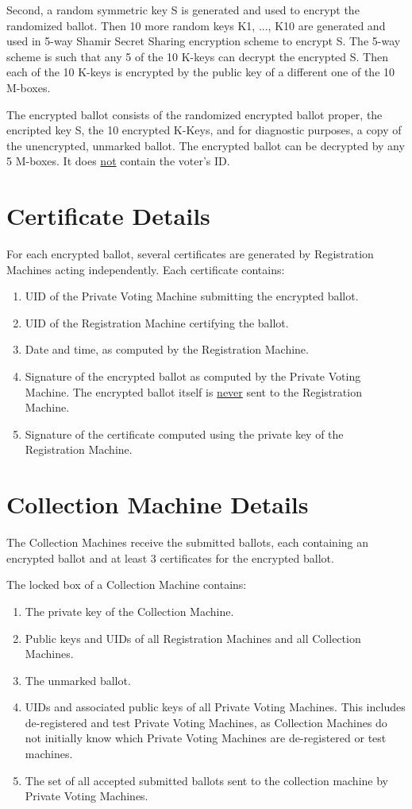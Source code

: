 \documentclass[12pt]{article}
\begin{document}
Second, a random symmetric key S is generated and used to encrypt
the randomized ballot.  Then 10 more random keys K1, ..., K10 are generated
and used in 5-way Shamir Secret Sharing encryption
scheme to encrypt S.  The 5-way
scheme is such that any 5 of the 10 K-keys can decrypt the encrypted S.
Then each of the 10 K-keys is encrypted by the public key
of a different one of the 10 M-boxes.

The encrypted ballot consists of the randomized encrypted ballot proper,
the encripted key S, the 10 encrypted K-Keys, and for
diagnostic purposes, a copy of the unencrypted, unmarked ballot.  The
encrypted ballot can be decrypted
by any 5 M-boxes.  It does \underline{not} contain the voter's ID.

\section{Certificate Details}

For each encrypted ballot, several certificates are generated
by Registration Machines acting independently.  Each certificate
contains:
\begin{enumerate}
\item UID of the Private Voting Machine submitting the encrypted ballot.
\item UID of the Registration Machine certifying the ballot.
\item Date and time, as computed by the Registration Machine.
\item Signature of the encrypted ballot as computed by the
      Private Voting Machine.  The encrypted ballot itself is
      \underline{never} sent to the Registration Machine.
\item Signature of the certificate computed using the private key of
the Registration Machine.
\end{enumerate}

\section{Collection Machine Details}

The Collection Machines receive the submitted ballots, each containing
an encrypted ballot and at least 3 certificates for the encrypted
ballot.

The locked box of a Collection Machine contains:
\begin{enumerate}
\item The private key of the Collection Machine.
\item Public keys and UIDs of all Registration Machines and all Collection
Machines.
\item The unmarked ballot.
\item UIDs and associated public keys of all Private Voting
Machines.  This includes de-registered and test Private Voting
Machines, as Collection Machines do not initially know which Private Voting
Machines are de-registered or test machines.
\item The set of all accepted submitted ballots sent to the collection machine
by Private Voting Machines.
\end{enumerate}
\end{document}

